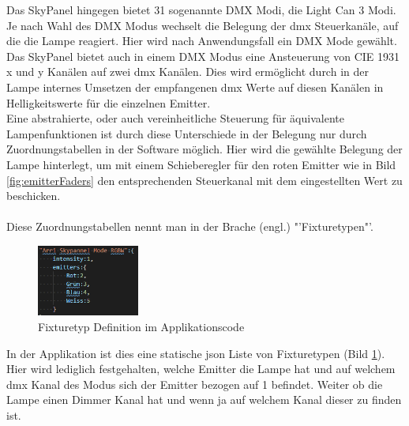 \documentclass[11pt]{scrartcl}
\begin{document}
\noindent
Das SkyPanel hingegen bietet 31 sogenannte DMX Modi, die Light Can 3 Modi. Je nach Wahl des DMX Modus wechselt die Belegung der \ac{dmx} Steuerkanäle, auf die
die Lampe reagiert. Hier wird nach Anwendungsfall ein DMX Mode gewählt. Das SkyPanel bietet auch in einem DMX Modus eine Ansteuerung von CIE 1931 x und
y Kanälen auf zwei \ac{dmx} Kanälen. Dies wird ermöglicht durch in der Lampe internes Umsetzen der empfangenen \ac{dmx} Werte auf diesen Kanälen in Helligkeitswerte
für die einzelnen Emitter.\\
Eine abstrahierte, oder auch vereinheitliche Steuerung für äquivalente Lampenfunktionen ist durch diese Unterschiede in der Belegung nur durch
Zuordnungstabellen in der Software möglich. Hier wird die gewählte Belegung der Lampe hinterlegt, um mit einem Schieberegler für den roten Emitter
wie in Bild \ref{fig:emitterFaders} den entsprechenden Steuerkanal mit dem eingestellten Wert zu beschicken.\\
\\
Diese Zuordnungstabellen nennt man in der Brache (engl.) "'Fixturetypen"'.
\clearpage
\begin{figure}
    \vspace{-25pt}
    \begin{center}
        \includegraphics[width=0.3\textwidth]{images/code_fixturetype_skypanel.png}
    \end{center}
    \vspace{-20pt}
    \caption{Fixturetyp Definition im Applikationscode} \label{fig:code_fixturetype}
    \vspace{-15pt}
\end{figure}
\noindent
In der Applikation ist dies eine statische \ac{json} Liste von Fixturetypen (Bild \ref{fig:code_fixturetype}). Hier wird lediglich festgehalten, welche
Emitter die Lampe hat und auf welchem \ac{dmx} Kanal des Modus sich der Emitter bezogen auf 1 befindet. Weiter ob die Lampe einen Dimmer Kanal hat und
wenn ja auf welchem Kanal dieser zu finden ist.
\end{document}
